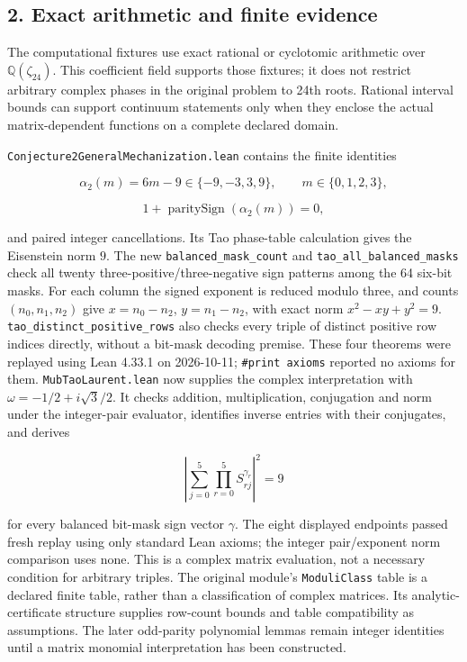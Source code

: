 \documentclass[
]{article}
\begin{document}
\subsection{2. Exact arithmetic and finite
evidence}\label{exact-arithmetic-and-finite-evidence}

The computational fixtures use exact rational or cyclotomic arithmetic
over \(\mathbb Q(\zeta_{24})\). This coefficient field supports those
fixtures; it does not restrict arbitrary complex phases in the original
problem to 24th roots. Rational interval bounds can support continuum
statements only when they enclose the actual matrix-dependent functions
on a complete declared domain.

\nolinkurl{Conjecture2GeneralMechanization.lean} contains the finite
identities

\[
\alpha_2(m)=6m-9\in\{-9,-3,3,9\},\qquad m\in\{0,1,2,3\},
\]

\[
1+\operatorname{paritySign}(\alpha_2(m))=0,
\]

and paired integer cancellations. Its Tao phase-table calculation gives
the Eisenstein norm \(9\). The new \nolinkurl{balanced_mask_count} and
\nolinkurl{tao_all_balanced_masks} check all twenty
three-positive/three-negative sign patterns among the 64 six-bit masks.
For each column the signed exponent is reduced modulo three, and counts
\((n_0,n_1,n_2)\) give \(x=n_0-n_2\), \(y=n_1-n_2\), with exact norm
\(x^2-xy+y^2=9\). \nolinkurl{tao_distinct_positive_rows} also checks
every triple of distinct positive row indices directly, without a
bit-mask decoding premise. These four theorems were replayed using Lean
4.33.1 on 2026-10-11; \nolinkurl{#print axioms} reported no axioms for
them. \nolinkurl{MubTaoLaurent.lean} now supplies the complex
interpretation with \(\omega=-1/2+i\sqrt3/2\). It checks addition,
multiplication, conjugation and norm under the integer-pair evaluator,
identifies inverse entries with their conjugates, and derives

\[
\left|\sum_{j=0}^5\prod_{r=0}^5 S_{rj}^{\gamma_r}\right|^2=9
\]

for every balanced bit-mask sign vector \(\gamma\). The eight displayed
endpoints passed fresh replay using only standard Lean axioms; the
integer pair/exponent norm comparison uses none. This is a complex
matrix evaluation, not a necessary condition for arbitrary triples. The
original module's \nolinkurl{ModuliClass} table is a declared finite
table, rather than a classification of complex matrices. Its
analytic-certificate structure supplies row-count bounds and table
compatibility as assumptions. The later odd-parity polynomial lemmas
remain integer identities until a matrix monomial interpretation has
been constructed.
\end{document}
